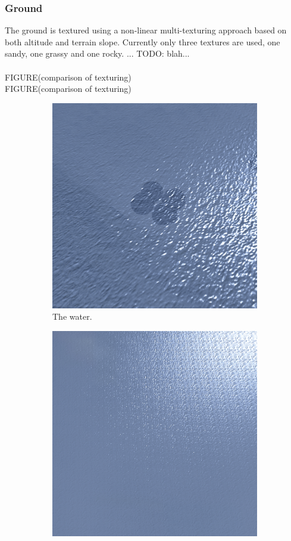 \subsubsection{Ground}
The ground is textured using a non-linear multi-texturing approach based on both altitude and terrain slope. Currently only three textures are used, one sandy, one grassy and one rocky. ... TODO: blah...\\
\\
FIGURE(comparison of texturing)
\\
FIGURE(comparison of texturing)
\\
\begin{figure}[H]
\begin{subfigure}{.5\textwidth}
  \centering
  \includegraphics[width=0.9\linewidth]{images/waterWaves.png}
  \caption{The water.}
  \label{fig:waterWaves}
\end{subfigure}%
\begin{subfigure}{.5\textwidth}
  \centering
  \includegraphics[width=0.9\linewidth]{images/waterGlimmer.png}

\end{subfigure}
\end{figure}
